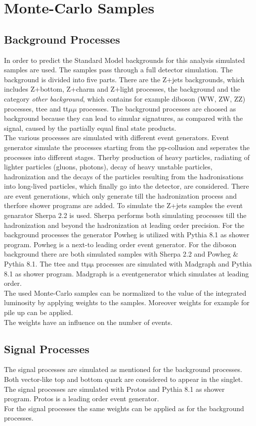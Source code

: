 \chapter{Monte-Carlo Samples}

\section{Background Processes}
\label{samples}
In order to predict the Standard Model backgrounds for this analysis simulated samples are used. 
The samples pass through a full detector simulation.
The background is divided into five parts.
There are the Z+jets backgrounds, which includes Z+bottom, Z+charm and Z+light processes, the \ttbar{} background and the category \textit{other background}, which contains for example diboson (WW, ZW, ZZ) processes, ttee and tt$\mu \mu$ processes.
The background processes are choosed as background because they can lead to simular signatures, as compared with the signal, caused by the partially equal final state products.\\
The various processes are simulated with different event generators.
Event generator simulate the processes starting from the pp-collusion and seperates the processes into different stages.
Therby production of heavy particles, radiating of lighter particles (gluons, photons), decay of heavy unstable particles, hadronization and the decays of the particles resulting from the hadronisations into long-lived particles, which finally go into the detector, are considered.
There are event generations, which only generate till the hadronization process and therfore shower programs are added.
To simulate the Z+jets samples the event genarator Sherpa 2.2 is used.
Sherpa \cite{Sherpa} performs both simulating processes till the hadronization and beyond the hadronization at leading order precision. 
For the \ttbar{} background processes the generator Powheg is utilized with Pythia 8.1 \cite{Pythia} as shower program.
Powheg \cite{Powheg} is a next-to leading order event generator.
For the diboson background there are both simulated samples with Sherpa 2.2 and Powheg \& Pythia 8.1.
The ttee and $\mathrm{tt \mu \mu}$ processes are simulated with Madgraph  and Pythia 8.1 as shower program.
Madgraph \cite{Madgraph} is a eventgenerator which simulates at leading order.\\
The used Monte-Carlo samples can be normalized to the value of the integrated luminosity by applying weights to the samples.
Moreover weights for example for pile up can be applied.\\
The weights have an influence on the number of events. 


\section{Signal Processes}
The signal processes are simulated as mentioned for the background processes.
Both vector-like top and bottom quark are considered to appear in the singlet.
The signal processes are simulated with Protos and Pythia 8.1 as shower program.
Protos \cite{Protos} is a leading order event generator.\\
For the signal processes the same weights can be applied as for the background processes.
